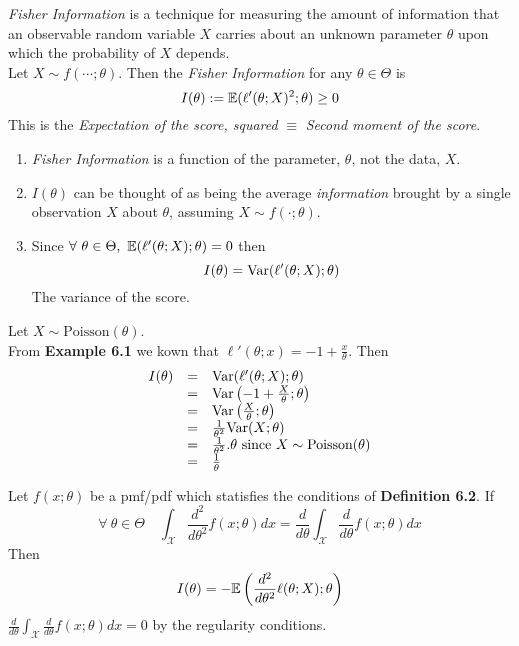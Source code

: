 \documentclass[11pt,a4paper]{article}
\begin{document}
\textit{Fisher Information} is a technique for measuring the amount of information that an observable random variable $X$ carries about an unknown parameter $\theta$ upon which the probability of $X$ depends.\\
Let $X\sim f(\cdots;\theta)$. Then the \textit{Fisher Information} for any $\theta\in\Theta$ is
$$I(\theta):=\mathbb{E}(\ell'(\theta;X)^2;\theta)\geq0$$
\nb This is the \textit{Expectation of the score, squared} $\equiv$ \textit{Second moment of the score}.\\

\begin{enumerate}[label=\roman*)]
	\item \textit{Fisher Information} is a function of the parameter, $\theta$, not the data, $X$.
	\item $I(\theta)$ can be thought of as being the average \textit{information} brought by a single observation $X$ about $\theta$, assuming $X\sim f(\cdot;\theta)$.
	\item Since $\forall\ \theta\in\Theta,\ \expect(\ell'(\theta;X);\theta)=0$ then
	$$I(\theta)=\mathrm{Var}(\ell'(\theta;X);\theta)$$
	The variance of the score.
\end{enumerate}

Let $X\sim\text{Poisson}(\theta)$.\\
From \textbf{Example 6.1} we kown that $\ell'(\theta;x)=-1+\frac{x}{\theta}$. Then
\[\begin{array}{rcl}
I(\theta)&=&\mathrm{Var}(\ell'(\theta;X);\theta)\\
&=&\mathrm{Var}\left(-1+\frac{X}{\theta};\theta\right)\\
&=&\mathrm{Var}\left(\frac{X}{\theta};\theta\right)\\
&=&\frac{1}{\theta^2}\mathrm{Var}(X;\theta)\\
&=&\frac{1}{\theta^2}.\theta\text{ since }X\sim\text{Poisson}(\theta)\\
&=&\frac{1}{\theta}
\end{array}\]

Let $f(x;\theta)$ be a pmf/pdf which statisfies the conditions of \textbf{Definition 6.2}. If
$$\forall\ \theta\in\Theta\quad \int_\mathcal{X}\frac{d^2}{d\theta^2}f(x;\theta)dx=\frac{d}{d\theta}\int_\mathcal{X}\frac{d}{d\theta}f(x;\theta)dx$$
Then
$$I(\theta)=-\mathbb{E}\left(\frac{d^2}{d\theta^2}\ell(\theta;X);\theta\right)$$
\nb ${\displaystyle\frac{d}{d\theta}\int_\mathcal{X}\frac{d}{d\theta}f(x;\theta)dx=0}$ by the regularity conditions.\\
\end{document}
